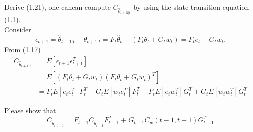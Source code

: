 \documentclass[a4 paper]{article}
\begin{document}
Derive (1.21), one cancan compute $C_{\hat{\theta}_{t+1|t}}$ by using the state transition equation (1.1).\\
Consider
\begin{equation}
\epsilon_{t+1}=\hat{\theta}_{t+1|t}-\theta_{t+1|t}=F_t\hat{\theta}_t-(F_t\theta_t+G_t{w}_t)=F_{t}e_t-G_{t}w_t.
\end{equation}
From (1.17)
\begin{equation}
\begin{split}
    C_{\hat{\theta}_{t+1|t}}&=E[\epsilon_{t+1}\epsilon_{t+1}^T]\\
    &=E[(F_{t}\theta_t+G_tw_t)(F_{t}\theta_t+G_tw_t)^T]\\
    &=F_tE[e_te_t^T]F_t^T-G_tE[w_te_t^T]F_t^T-F_tE[e_tw_t^T]G_t^T+G_tE[w_tw_t^T]G_t^T
\end{split}
\end{equation}
\begin{tcolorbox}[colback=RubineRed!5!white,colframe=RubineRed!75!black]
Please show that 
\begin{equation}
     C_{\hat{\theta}_{t|t-1}}=F_{t-1} C_{\hat{\theta}_{t-1}}F_{t-1}^T+G_{t-1}C_{w}(t-1,t-1)G_{t-1}^T
\end{equation}
\end{tcolorbox}
\end{document}
